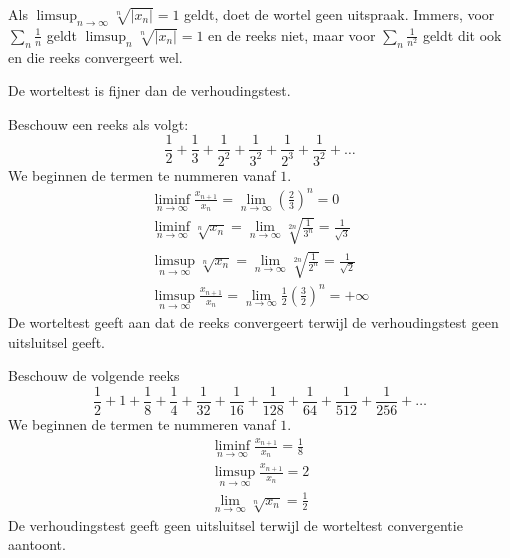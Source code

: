 \documentclass[main.tex]{subfiles}
\begin{document}
\begin{opm}
  Als $\limsup_{n\rightarrow \infty}\sqrt[n]{|x_{n}|}= 1$ geldt, doet de wortel geen uitspraak.
  Immers, voor $\sum_{n}\frac{1}{n}$ geldt $\limsup_{n}\sqrt[n]{|x_{n}|} = 1$ en de reeks niet, maar voor $\sum_{n}\frac{1}{n^{2}}$ geldt dit ook en die reeks convergeert wel.
\end{opm}


\begin{st}
  De worteltest is fijner dan de verhoudingstest.
\end{st}

\begin{vb}
  Beschouw een reeks als volgt:
  \[ \frac{1}{2} + \frac{1}{3} + \frac{1}{2^{2}} + \frac{1}{3^{2}} + \frac{1}{2^{3}} + \frac{1}{3^{2}} + \dotsc \]
  We beginnen de termen te nummeren vanaf $1$.
  \begin{align*}
    \liminf_{n\rightarrow \infty}\frac{x_{n+1}}{x_{n}} = \lim_{n \rightarrow \infty}\left(\frac{2}{3}\right)^{n} = 0\\
    \liminf_{n\rightarrow \infty}\sqrt[n]{x_{n}} = \lim_{n \rightarrow \infty}\sqrt[2n]{\frac{1}{3^{n}}} = \frac{1}{\sqrt{3}}\\
    \limsup_{n\rightarrow \infty}\sqrt[n]{x_{n}} = \lim_{n\rightarrow \infty}\sqrt[2n]{\frac{1}{2^{n}}} = \frac{1}{\sqrt{2}}\\
    \limsup_{n\rightarrow \infty}\frac{x_{n+1}}{x_{n}} = \lim_{n\rightarrow \infty}\frac{1}{2}\left(\frac{3}{2}\right)^{n} = +\infty
  \end{align*}
  De worteltest geeft aan dat de reeks convergeert terwijl de verhoudingstest geen uitsluitsel geeft.
\end{vb}

\begin{vb}
  Beschouw de volgende reeks
  \[ \frac{1}{2} + 1 + \frac{1}{8} + \frac{1}{4} + \frac{1}{32} + \frac{1}{16} + \frac{1}{128} + \frac{1}{64} + \frac{1}{512} + \frac{1}{256} + \dotsc \]
  We beginnen de termen te nummeren vanaf $1$.
  \begin{align*}
    \liminf_{n\rightarrow\infty}\frac{x_{n+1}}{x_{n}}=\frac{1}{8}\\
    \limsup_{n\rightarrow\infty}\frac{x_{n+1}}{x_{n}}=2\\
    \lim_{n\rightarrow\infty}\sqrt[n]{x_{n}} = \frac{1}{2}
  \end{align*}
  De verhoudingstest geeft geen uitsluitsel terwijl de worteltest convergentie aantoont.
\end{vb}
\end{document}
